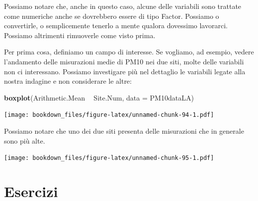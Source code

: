\documentclass[]{book}
\newenvironment{Shaded}{\begin{snugshade}}{\end{snugshade}}
\newcommand{\DataTypeTok}[1]{\textcolor[rgb]{0.13,0.29,0.53}{#1}}
\newcommand{\DecValTok}[1]{\textcolor[rgb]{0.00,0.00,0.81}{#1}}
\newcommand{\KeywordTok}[1]{\textcolor[rgb]{0.13,0.29,0.53}{\textbf{#1}}}
\newcommand{\NormalTok}[1]{#1}
\newcommand{\OperatorTok}[1]{\textcolor[rgb]{0.81,0.36,0.00}{\textbf{#1}}}
\newcommand{\StringTok}[1]{\textcolor[rgb]{0.31,0.60,0.02}{#1}}
\begin{document}
Possiamo notare che, anche in questo caso, alcune delle variabili sono trattate come numeriche anche se dovrebbero essere di tipo Factor. Possiamo o convertirle, o semplicemente tenerlo a mente qualora dovessimo lavorarci. Possiamo altrimenti rimuoverle come visto prima.

Per prima cosa, definiamo un campo di interesse. Se vogliamo, ad esempio, vedere l'andamento delle misurazioni medie di PM10 nei due siti, molte delle variabili non ci interessano. Possiamo investigare più nel dettaglio le variabili legate alla nostra indagine e non considerare le altre:

\begin{Shaded}
\begin{Highlighting}[]
\KeywordTok{boxplot}\NormalTok{(Arithmetic.Mean }\OperatorTok{~}\StringTok{ }\NormalTok{Site.Num, }\DataTypeTok{data =}\NormalTok{ PM10dataLA)}
\end{Highlighting}
\end{Shaded}

\texttt{[image: bookdown\_files/figure-latex/unnamed-chunk-94-1.pdf]}

Possiamo notare che uno dei due siti presenta delle misurazioni che in generale sono più alte.

\begin{Shaded}
\end{Shaded}

\texttt{[image: bookdown\_files/figure-latex/unnamed-chunk-95-1.pdf]}

\hypertarget{esercizi-2}{%
\section{Esercizi}\label{esercizi-2}}
\end{document}
